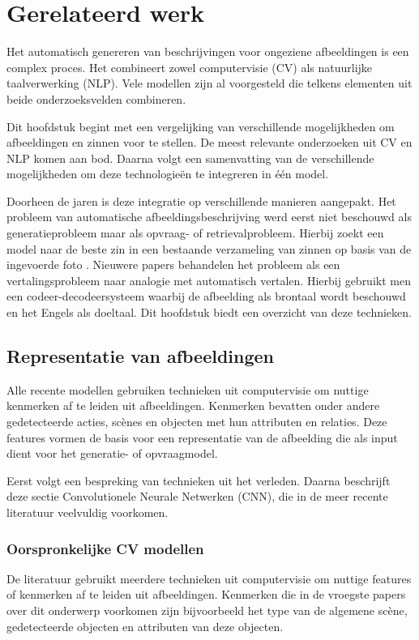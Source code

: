 \chapter{Gerelateerd werk}
\label{hoofdstuk:related}
Het automatisch genereren van beschrijvingen voor ongeziene afbeeldingen is een complex proces. Het combineert zowel computervisie (CV) als natuurlijke taalverwerking (NLP). Vele modellen zijn al voorgesteld die telkens elementen uit beide onderzoeksvelden combineren. 

Dit hoofdstuk begint met een vergelijking van verschillende mogelijkheden om afbeeldingen en zinnen voor te stellen. De meest relevante onderzoeken uit CV en NLP komen aan bod. Daarna volgt een samenvatting van de verschillende mogelijkheden om deze technologie\"en te integreren in \'e\'en model. 

Doorheen de jaren is deze integratie op verschillende manieren aangepakt. Het probleem van automatische afbeeldingsbeschrijving werd eerst niet beschouwd als generatieprobleem maar als opvraag- of retrievalprobleem. Hierbij zoekt een model naar de beste zin in een bestaande verzameling van zinnen op basis van de ingevoerde foto \cite{Hodosh2013}. Nieuwere papers behandelen het probleem als een vertalingsprobleem naar analogie met automatisch vertalen. Hierbij gebruikt men een codeer-decodeersysteem waarbij de afbeelding als brontaal wordt beschouwd en het Engels als doeltaal. Dit hoofdstuk biedt een overzicht van deze technieken.

\section{Representatie van afbeeldingen}
Alle recente modellen gebruiken technieken uit computervisie om nuttige kenmerken af te leiden uit afbeeldingen. Kenmerken bevatten onder andere gedetecteerde acties, sc\`enes en objecten met hun attributen en relaties\cite{Bernardi}. Deze features vormen de basis voor een representatie van de afbeelding die als input dient voor het generatie- of opvraagmodel.

Eerst volgt een bespreking van technieken uit het verleden. Daarna beschrijft deze sectie Convolutionele Neurale Netwerken (CNN), die in de meer recente literatuur veelvuldig voorkomen.


\subsection{Oorspronkelijke CV modellen}
De literatuur gebruikt meerdere technieken uit computervisie om nuttige features of kenmerken af te leiden uit afbeeldingen. Kenmerken die in de vroegste papers over dit onderwerp voorkomen zijn bijvoorbeeld het type van de algemene sc\`ene, gedetecteerde objecten en attributen van deze objecten\cite{Farhadi2010,Patterson2014,Yang2011}.

